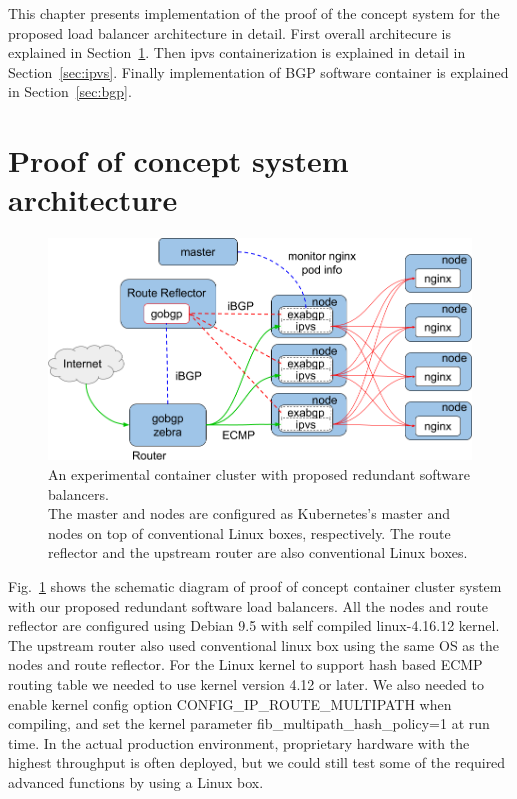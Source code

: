 This chapter presents implementation of the proof of the concept system for the proposed load balancer architecture in detail.
First overall architecure is explained in Section~\ref{sec:poc}.
Then ipvs containerization is explained in detail in Section~\ref{sec:ipvs}.
Finally implementation of BGP software container is explained in Section~\ref{sec:bgp}.

\section{Proof of concept system architecture}\label{sec:poc}

\begin{figure}[tb]
\begin{center}
\includegraphics[width=0.8\columnwidth]{Figs/poc.png}
\end{center}
\caption{
  An experimental container cluster with proposed redundant software balancers. \\ %
  The master and nodes are configured as Kubernetes's master and nodes on top of conventional Linux boxes, respectively.
  The route reflector and the upstream router are also conventional Linux boxes.
}
\label{fig:poc}
\end{figure}

Fig.~\ref{fig:poc} shows the schematic diagram of proof of concept container cluster system with our proposed redundant software load balancers.
All the nodes and route reflector are configured using Debian 9.5 with self compiled linux-4.16.12 kernel.  
The upstream router also used conventional linux box using the same OS as the nodes and route reflector.
For the Linux kernel to support hash based ECMP routing table we needed to use kernel version 4.12 or later.
We also needed to enable kernel config option CONFIG\_IP\_ROUTE\_MULTIPATH\cite{ipsysctl} when compiling, and set the kernel parameter fib\_multipath\_hash\_policy=1 at run time.
In the actual production environment, proprietary hardware with the highest throughput is often deployed, but we could still test some of the required advanced functions by using a Linux box.

